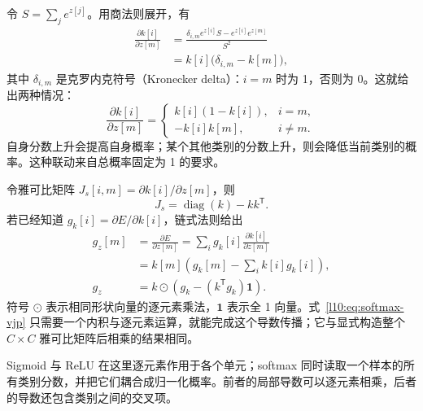 令 $S=\sum_j e^{z[j]}$。用商法则展开，有
\begin{align}
 \frac{\partial k[i]}{\partial z[m]}
 &=\frac{\delta_{i,m}e^{z[i]}S-e^{z[i]}e^{z[m]}}{S^2}\\
 &=k[i]\bigl(\delta_{i,m}-k[m]\bigr),
 \label{l10:eq:softmax-jac-entry}
\end{align}
其中 $\delta_{i,m}$ 是克罗内克符号（Kronecker delta）：$i=m$ 时为 1，否则为 0。这就给出两种情况：
\begin{equation}
 \frac{\partial k[i]}{\partial z[m]}=
 \begin{cases}
 k[i](1-k[i]),&i=m,\\
 -k[i]k[m],&i\ne m.
 \end{cases}
\end{equation}
自身分数上升会提高自身概率；某个其他类别的分数上升，则会降低当前类别的概率。这种联动来自总概率固定为 1 的要求。

令雅可比矩阵 $J_{\!s}[i,m]=\partial k[i]/\partial z[m]$，则
\begin{equation}
 J_{\!s}=\operatorname{diag}(k)-kk^{\mathsf T}.
 \label{l10:eq:softmax-jacobian}
\end{equation}
若已经知道 $g_k[i]=\partial E/\partial k[i]$，链式法则给出
\begin{align}
 g_z[m]&=\frac{\partial E}{\partial z[m]}
 =\sum_i g_k[i]\frac{\partial k[i]}{\partial z[m]}\\
 &=k[m]\left(g_k[m]-\sum_i k[i]g_k[i]\right),
 \label{l10:eq:softmax-vjp-component}\\
 g_z&=k\mathbin{\odot}\left(g_k-(k^{\mathsf T}g_k)\mathbf{1}\right).
 \label{l10:eq:softmax-vjp}
\end{align}
符号 $\odot$ 表示相同形状向量的逐元素乘法，$\mathbf{1}$ 表示全 1 向量。式~\eqref{l10:eq:softmax-vjp} 只需要一个内积与逐元素运算，就能完成这个导数传播；它与显式构造整个 $C\times C$ 雅可比矩阵后相乘的结果相同。

\begin{keybox}[title={激活函数与 softmax 的作用范围}]
Sigmoid 与 ReLU 在这里逐元素作用于各个单元；softmax 同时读取一个样本的所有类别分数，并把它们耦合成归一化概率。前者的局部导数可以逐元素相乘，后者的导数还包含类别之间的交叉项。
\end{keybox}
